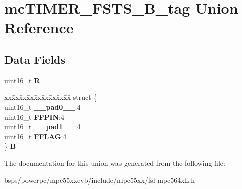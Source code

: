 \hypertarget{unionmcTIMER__FSTS__16B__tag}{}\section{mc\+T\+I\+M\+E\+R\+\_\+\+F\+S\+T\+S\+\_\+B\+\_\+tag Union Reference}
\label{unionmcTIMER__FSTS__16B__tag}
\subsection*{Data Fields}
\begin{DoxyCompactItemize}
\item 
\mbox{\label{unionmcTIMER__FSTS__16B__tag_aec98e59cab4d49f5bb64b71a850da42f}} 
uint16\+\_\+t {\bfseries R}
\item 
\mbox{\label{unionmcTIMER__FSTS__16B__tag_a355334d7b1ffc20f253779fd0a553dd5}} 
\begin{tabbing}
xx\=xx\=xx\=xx\=xx\=xx\=xx\=xx\=xx\=\kill
struct \{\\
\>uint16\_t {\bfseries \_\_pad0\_\_}:4\\
\>uint16\_t {\bfseries FFPIN}:4\\
\>uint16\_t {\bfseries \_\_pad1\_\_}:4\\
\>uint16\_t {\bfseries FFLAG}:4\\
\} {\bfseries B}\\

\end{tabbing}\end{DoxyCompactItemize}


The documentation for this union was generated from the following file\+:\begin{DoxyCompactItemize}
\item 
bsps/powerpc/mpc55xxevb/include/mpc55xx/fsl-\/mpc564x\+L.\+h\end{DoxyCompactItemize}
